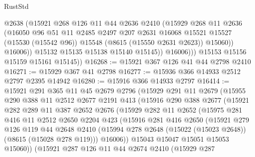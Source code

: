 \begin{lexlean}{RustStd}
\begin{coremodule}
                    @2638
                    (@15921
                      @268
                      @126
                      @11
                      @44
                      @2636
                      @2410
                      (@15929
                        @268
                        @11
                        @2636
                        (@16050
                          @96
                          @51
                          @11
                          @2485
                          @2497
                          @207
                          @2631
                          @16068
                          @15521
                          @15527
                          (@15530 (@15542 @96))
                          @15548
                          (@8615 (@15550 @2631 @2623))
                          @15060))
                      @16006))
                  @15132
                  @15135
                  @15138
                  @15140
                  @15145))
              @16006)))
        @15153
        @15156
        @15159
        @15161
        @15145))
@16268 := @15921 @367 @126 @41 @44 @2798 @2410
@16271 := @15929 @367 @41 @2798
@16277 := @15936 @366 @14933 @2512 @2797 @2395 @14942
@16280 := @15916 @366 @14933 @2797
@16414 := @15921
    @291
    @365
    @11
    @45
    @2679
    @2796
    (@15929
      @291
      @11
      @2679
      (@15955
        @290
        @388
        @11
        @2512
        @2677
        @2191
        @413
        (@15916
          @290
          @388
          @2677
          (@15921
            @282
            @289
            @11
            @387
            @2652
            @2676
            (@15929
              @282
              @11
              @2652
              (@15975
                @281
                @416
                @11
                @2512
                @2650
                @2204
                @423
                (@15916
                  @281
                  @416
                  @2650
                  (@15921
                    @279
                    @126
                    @119
                    @44
                    @2648
                    @2410
                    (@15994 @278 @2648 (@15022 (@15023 @2648)) (@8615 (@15028 @278 @119)))
                    @16006))
                @15043
                @15047
                @15051
                @15053
                @15060))
            (@15921
              @287
              @126
              @11
              @44
              @2674
              @2410
              (@15929
                @287

\end{coremodule}
\end{lexlean}
